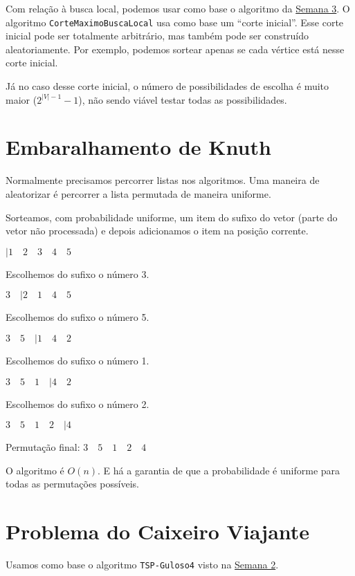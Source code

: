 Com relação à busca local, podemos usar como base o algoritmo da \hyperref[chp:semana3]{Semana 3}. O algoritmo \lstinline{CorteMaximoBuscaLocal} usa como base um ``corte inicial''. Esse corte inicial pode ser totalmente arbitrário, mas também pode ser construído aleatoriamente. Por exemplo, podemos sortear apenas se cada vértice está nesse corte inicial.

Já no caso desse corte inicial, o número de possibilidades de escolha é muito maior ($2^{|V|-1}-1$), não sendo viável testar todas as possibilidades.

\section{Embaralhamento de Knuth}

Normalmente precisamos percorrer listas nos algoritmos. Uma maneira de aleatorizar é percorrer a lista permutada de maneira uniforme.

Sorteamos, com probabilidade uniforme, um item do sufixo do vetor (parte do vetor não processada) e depois adicionamos o item na posição corrente.

\begin{example}
    $|1 \quad 2 \quad 3 \quad 4 \quad 5$

    Escolhemos do sufixo o número 3.

    $3 \quad |2 \quad 1 \quad 4 \quad 5$

    Escolhemos do sufixo o número 5.

    $3 \quad 5 \quad |1 \quad 4 \quad 2$

    Escolhemos do sufixo o número 1.

    $3 \quad 5 \quad 1 \quad |4 \quad 2$

    Escolhemos do sufixo o número 2.

    $3 \quad 5 \quad 1 \quad 2 \quad |4$

    Permutação final: $3 \quad 5 \quad 1 \quad 2 \quad 4$
\end{example}

O algoritmo é $O(n)$. E há a garantia de que a probabilidade é uniforme para todas as permutações possíveis.

\section{Problema do Caixeiro Viajante}

Usamos como base o algoritmo \lstinline{TSP-Guloso4} visto na \hyperref[chp:semana2]{Semana 2}.

